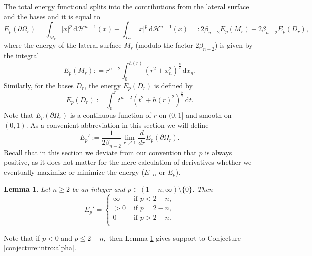 \documentclass[10pt,leqno]{amsart}
\newcommand{\p}{\partial}
\newcommand{\dd}{\, \mathrm{d}}
\newcommand{\dH}{\, \mathrm{d} \mathcal{H}^{n-1}}
\numberwithin{Theorem}{section}
\newtheorem{Lemma}[Theorem]{Lemma}
\theoremstyle{definition}
\theoremstyle{remark}
\numberwithin{equation}{section}
\numberwithin{equation}{section}
\begin{document}
The total energy functional splits into the contributions from the lateral surface and the bases and it is equal to 
\begin{equation}
    E_p(\p \Omega_r) = \int_{M_r} |x|^{p} \dH(x) +  \int_{D_r} |x|^{p} \dH(x) =: 2\beta_{n-2}E_p(M_r) + 2\beta_{n-2} E_p(D_r),
\end{equation}
where the energy of the  lateral surface $M_r$ (modulo the factor $2\beta_{n-2}$)  is given by the integral
\begin{equation}
    E_p(M_r): = r^{n-2} \int_0^{h(r)} (r^2 + x_n^2)^{\frac{p}{2}} \dd x_n .
\end{equation}
Similarly, for the bases $D_r$, the energy $E_p(D_r)$ is defined by
\begin{equation}
    E_p(D_r) :=  \int_0^r t^{n-2} (t^2 + h(r)^2)^{\frac{p}{2}} \dd t .
\end{equation}
Note that $E_p(\p\Omega_r)$ is a continuous function of $r$ on $(0,1]$ and smooth on $(0,1).$ As a convenient abbreviation in this section we will define
$$
  E_p':= \frac{1}{2\beta_{n-2}}\lim_{r\nearrow 1} \frac{d}{dr} E_p(\partial\Omega_r)  .
$$
Recall that in this section we deviate from our convention that $p$ is always positive, as it does not matter for the mere calculation of derivatives whether we eventually maximize or minimize the energy ($E_{-\alpha}$ or $E_p$). 

\begin{Lemma}\label{lemma:first variation of Ep}
Let $n\geq 2$ be an integer and $ p\in(1-n,\infty)\setminus\{0\}$. Then 
\begin{equation} \label{eq:thesis_first}
    E_p' =\begin{cases}
          \infty   & \text{ if } p<2-n, \\
      >0 & \text{ if } p = 2-n, \\
    0 & \text{ if } p>2-n. \\
      \end{cases}
\end{equation}
\end{Lemma}


Note that if $p<0$ and $p\leq 2-n,$ then Lemma \ref{lemma:first variation of Ep} gives support to Conjecture \ref{conjecture:intro:alpha}.

\smallskip
\end{document}
